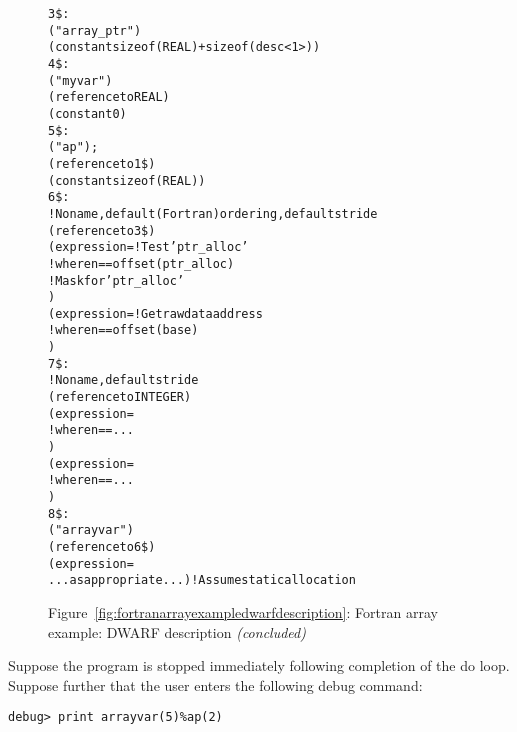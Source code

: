 \begin{figure}
\begin{dwflisting}
\begin{alltt}
3\$: \DWTAGstructuretype
        \DWATname("array\_ptr")
        \DWATbytesize(constant sizeof(REAL) + sizeof(desc<1>))
4\$:     \DWTAGmember
            \DWATname("myvar")
            \DWATtype(reference to REAL)
            \DWATdatamemberlocation(constant 0)
5\$:     \DWTAGmember
            \DWATname("ap");
            \DWATtype(reference to 1\$)
            \DWATdatamemberlocation(constant sizeof(REAL))
6\$: \DWTAGarraytype
        ! No name, default (Fortran) ordering, default stride
        \DWATtype(reference to 3\$)
        \DWATallocated(expression=       ! Test 'ptr\_alloc' 
            \DWOPpushobjectaddress
            \DWOPlitn                  ! where n == offset(ptr\_alloc)
            \DWOPplus
            \DWOPderef
            \DWOPlittwo                    ! Mask for 'ptr\_alloc' 
            \DWOPand)
        \DWATdatalocation(expression=   ! Get raw data address
            \DWOPpushobjectaddress
            \DWOPlitn                  ! where n == offset(base)
            \DWOPplus
            \DWOPderef)
7\$:     \DWTAGsubrangetype
            ! No name, default stride
            \DWATtype(reference to INTEGER)
            \DWATlowerbound(expression=
                \DWOPpushobjectaddress
                \DWOPlitn              ! where n == ...
                \DWOPplus
                \DWOPderef)
            \DWATupperbound(expression=
                \DWOPpushobjectaddress
                \DWOPlitn              ! where n == ...
                \DWOPplus
                \DWOPderef)
8\$: \DWTAGvariable
        \DWATname("arrayvar")
        \DWATtype(reference to 6\$)
        \DWATlocation(expression=
            ...as appropriate...)       ! Assume static allocation
\end{alltt}
\end{dwflisting}
\begin{center}
\vspace{3mm}
Figure~\ref{fig:fortranarrayexampledwarfdescription}: Fortran array example: DWARF description \textit{(concluded)}
\end{center}
\end{figure}

Suppose 
the program is stopped immediately following completion
of the do loop. Suppose further that the user enters the
following debug command:
\vspace{2mm}
\begin{lstlisting}[numbers=none]
debug> print arrayvar(5)%ap(2)
\end{lstlisting}

